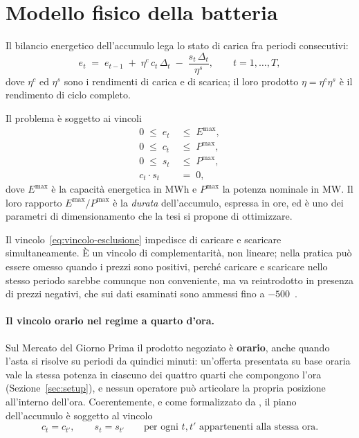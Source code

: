 \section{Modello fisico della batteria}
\label{sec:modello-fisico}

Il bilancio energetico dell'accumulo lega lo stato di carica fra periodi consecutivi:
\begin{equation}
e_t \;=\; e_{t-1} \;+\; \eta^{c}\, c_t\, \Delta_t \;-\; \frac{s_t\, \Delta_t}{\eta^{s}},
\qquad t = 1, \dots, T,
\label{eq:bilancio}
\end{equation}
dove $\eta^{c}$ ed $\eta^{s}$ sono i rendimenti di carica e di scarica; il loro prodotto
$\eta = \eta^{c}\eta^{s}$ \`e il rendimento di ciclo completo.

Il problema \`e soggetto ai vincoli
\begin{align}
0 \;\le\; e_t \;&\le\; E^{\max}, \label{eq:vincolo-energia}\\
0 \;\le\; c_t \;&\le\; P^{\max}, \label{eq:vincolo-carica}\\
0 \;\le\; s_t \;&\le\; P^{\max}, \label{eq:vincolo-scarica}\\
c_t \cdot s_t \;&=\; 0, \label{eq:vincolo-esclusione}
\end{align}
dove $E^{\max}$ \`e la capacit\`a energetica in MWh e $P^{\max}$ la potenza nominale in MW.
Il loro rapporto $E^{\max}/P^{\max}$ \`e la \emph{durata} dell'accumulo, espressa in ore, ed
\`e uno dei parametri di dimensionamento che la tesi si propone di ottimizzare.

Il vincolo~\eqref{eq:vincolo-esclusione} impedisce di caricare e scaricare simultaneamente.
\`E un vincolo di complementarit\`a, non lineare; nella pratica pu\`o essere omesso quando i
prezzi sono positivi, perch\'e caricare e scaricare nello stesso periodo sarebbe comunque
non conveniente, ma va reintrodotto in presenza di prezzi negativi, che sui dati esaminati
sono ammessi fino a $-500$~\euromwh{}.

\paragraph{Il vincolo orario nel regime a quarto d'ora.} Sul Mercato del Giorno Prima il
prodotto negoziato \`e \textbf{orario}, anche quando l'asta si risolve su periodi da quindici
minuti: un'offerta presentata su base oraria vale la stessa potenza in ciascuno dei quattro
quarti che compongono l'ora (Sezione~\ref{sec:setup}), e nessun operatore pu\`o articolare la
propria posizione all'interno dell'ora. Coerentemente, e come formalizzato da
\textcite{veenstra2025profitability}, il piano dell'accumulo \`e soggetto al vincolo
\begin{equation}
c_t = c_{t'}, \qquad s_t = s_{t'}
\qquad \text{per ogni } t, t' \text{ appartenenti alla stessa ora.}
\label{eq:vincolo-orario}
\end{equation}

